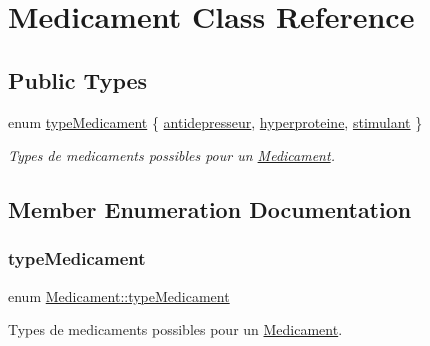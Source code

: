 \hypertarget{class_medicament}{}\section{Medicament Class Reference}
\label{class_medicament}
\subsection*{Public Types}
\begin{DoxyCompactItemize}
\item 
enum \mbox{\hyperlink{class_medicament_ae42cdcab46a248192a604af82a680526}{type\+Medicament}} \{ \mbox{\hyperlink{class_medicament_ae42cdcab46a248192a604af82a680526add495e749e8d5f7fc96cde90675cdb4d}{antidepresseur}}, 
\mbox{\hyperlink{class_medicament_ae42cdcab46a248192a604af82a680526a65e0dd5673fc93f7369a4529876473ab}{hyperproteine}}, 
\mbox{\hyperlink{class_medicament_ae42cdcab46a248192a604af82a680526a8e3da6e5160a977107a5703052fc5f1b}{stimulant}}
 \}
\begin{DoxyCompactList}\small\item\em Types de medicaments possibles pour un \mbox{\hyperlink{class_medicament}{Medicament}}. \end{DoxyCompactList}\end{DoxyCompactItemize}


\subsection{Member Enumeration Documentation}
\mbox{\label{class_medicament_ae42cdcab46a248192a604af82a680526}} 
\subsubsection{\texorpdfstring{type\+Medicament}{typeMedicament}}
{\footnotesize\ttfamily enum \mbox{\hyperlink{class_medicament_ae42cdcab46a248192a604af82a680526}{Medicament\+::type\+Medicament}}}



Types de medicaments possibles pour un \mbox{\hyperlink{class_medicament}{Medicament}}. 

